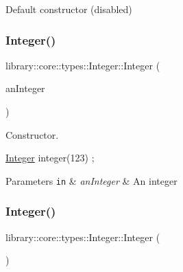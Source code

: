 Default constructor (disabled) 

\mbox{\label{classlibrary_1_1core_1_1types_1_1Integer_ac282b8e24c1d1a43e578c5be3c70ea27}} 
\subsubsection{\texorpdfstring{Integer()}{Integer()}\hspace{0.1cm}{\footnotesize\ttfamily [2/4]}}
{\footnotesize\ttfamily library\+::core\+::types\+::\+Integer\+::\+Integer (\begin{DoxyParamCaption}\item[{\hyperlink{classlibrary_1_1core_1_1types_1_1Integer_a623afb1580f870fd8a1997b1c12c917d}{Integer\+::\+Value\+Type}}]{an\+Integer }\end{DoxyParamCaption})}



Constructor. 


\begin{DoxyCode}
\hyperlink{classlibrary_1_1core_1_1types_1_1Integer_a6483b1c4e13e5ed6af5e7a58347efead}{Integer} integer(123) ;
\end{DoxyCode}



\begin{DoxyParams}[1]{Parameters}
\mbox{\tt in}  & {\em an\+Integer} & An integer \\
\hline
\end{DoxyParams}
\mbox{\label{classlibrary_1_1core_1_1types_1_1Integer_af3bcebe374c4b7b4329ed0a7fae04abd}} 
\subsubsection{\texorpdfstring{Integer()}{Integer()}\hspace{0.1cm}{\footnotesize\ttfamily [3/4]}}
{\footnotesize\ttfamily library\+::core\+::types\+::\+Integer\+::\+Integer (\begin{DoxyParamCaption}\item[{float}]{ }\end{DoxyParamCaption})\hspace{0.3cm}{\ttfamily [delete]}}



